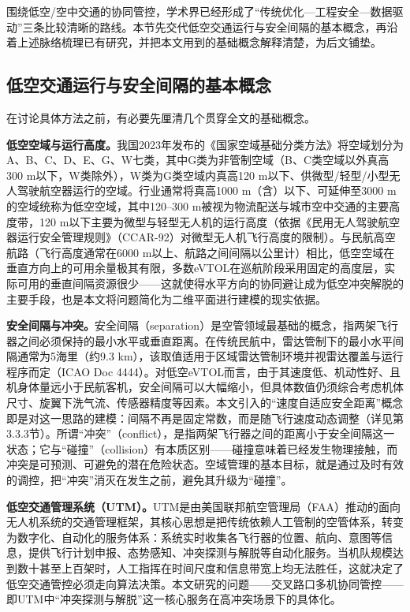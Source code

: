 \documentclass[12pt,a4paper,UTF8]{ctexart}
\begin{document}
围绕低空/空中交通的协同管控，学术界已经形成了“传统优化—工程安全—数据驱动”三条比较清晰的路线。本节先交代低空交通运行与安全间隔的基本概念，再沿着上述脉络梳理已有研究，并把本文用到的基础概念解释清楚，为后文铺垫。

\subsection{低空交通运行与安全间隔的基本概念}

在讨论具体方法之前，有必要先厘清几个贯穿全文的基础概念。

\textbf{低空空域与运行高度。}我国2023年发布的《国家空域基础分类方法》将空域划分为A、B、C、D、E、G、W七类，其中G类为非管制空域（B、C类空域以外真高300 m以下，W类除外），W类为G类空域内真高120 m以下、供微型/轻型/小型无人驾驶航空器运行的空域\cite{ref46}。行业通常将真高1000 m（含）以下、可延伸至3000 m的空域统称为低空空域\cite{ref46,ref48}，其中120--300 m被视为物流配送与城市空中交通的主要高度带，120 m以下主要为微型与轻型无人机的运行高度（依据《民用无人驾驶航空器运行安全管理规则》（CCAR-92）对微型无人机飞行高度的限制）\cite{ref47}。与民航高空航路（飞行高度通常在6000 m以上、航路之间间隔以公里计）相比，低空空域在垂直方向上的可用余量极其有限，多数eVTOL在巡航阶段采用固定的高度层，实际可用的垂直间隔资源很少——这就使得水平方向的协同避让成为低空冲突解脱的主要手段，也是本文将问题简化为二维平面进行建模的现实依据。

\textbf{安全间隔与冲突。}安全间隔（separation）是空管领域最基础的概念，指两架飞行器之间必须保持的最小水平或垂直距离。在传统民航中，雷达管制下的最小水平间隔通常为5海里（约9.3 km），该取值适用于区域雷达管制环境并视雷达覆盖与运行程序而定（ICAO Doc 4444）\cite{ref49}。对低空eVTOL而言，由于其速度低、机动性好、且机身体量远小于民航客机，安全间隔可以大幅缩小，但具体数值仍须综合考虑机体尺寸、旋翼下洗气流、传感器精度等因素。本文引入的“速度自适应安全距离”概念即是对这一思路的建模：间隔不再是固定常数，而是随飞行速度动态调整（详见第3.3.3节）。所谓“冲突”（conflict），是指两架飞行器之间的距离小于安全间隔这一状态；它与“碰撞”（collision）有本质区别——碰撞意味着已经发生物理接触，而冲突是可预测、可避免的潜在危险状态。空域管理的基本目标，就是通过及时有效的调控，把“冲突”消灭在发生之前，避免其升级为“碰撞”。

\textbf{低空交通管理系统（UTM）。}UTM是由美国联邦航空管理局（FAA）推动的面向无人机系统的交通管理框架，其核心思想是把传统依赖人工管制的空管体系，转变为数字化、自动化的服务体系：系统实时收集各飞行器的位置、航向、意图等信息，提供飞行计划申报、态势感知、冲突探测与解脱等自动化服务。当机队规模达到数十甚至上百架时，人工指挥在时间尺度和信息带宽上均无法胜任，这就决定了低空交通管控必须走向算法决策。本文研究的问题——交叉路口多机协同管控——即UTM中“冲突探测与解脱”这一核心服务在高冲突场景下的具体化。
\end{document}
